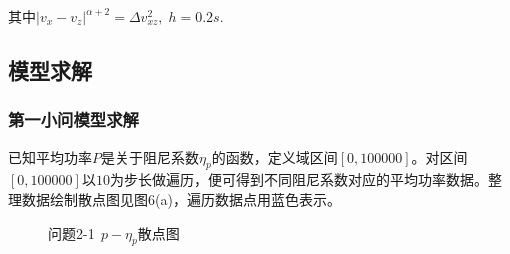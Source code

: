 \documentclass{article}
\numberwithin{equation}{subsection}
\begin{document}
其中$|v_{x}-v_{z}|^{\alpha+2}=\Delta v_{x z}^{2},\; h=0.2s $.
    

\subsection{模型求解}

\subsubsection{第一小问模型求解}
已知平均功率$P$是关于阻尼系数$\eta _p$的函数，定义域区间$[0,100000]$。对区间$[0,100000]$以$10$为步长做遍历，便可得到不同阻尼系数对应的平均功率数据。整理数据绘制散点图见图6(a)，遍历数据点用蓝色表示。

\begin{figure}[htbp]
    \centering
    \quad
    \caption{问题2-1$\;\,p-\eta _p$散点图}
\end{figure}
\end{document}
